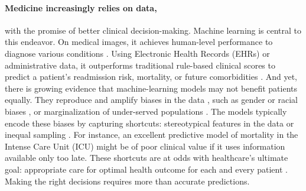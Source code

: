 \documentclass[french,12pt,twoside,a4paper]{book}
\begin{document}
\paragraph{Medicine increasingly relies on data,} with the promise of better
clinical decision-making. Machine learning is central to this endeavor.
On medical images, it achieves human-level performance to
diagnose various conditions
\citep{aggarwal2021diagnostic,esteva2021deep,liu2019comparison}.
Using Electronic Health Records (EHRs) or administrative data, it
outperforms traditional rule-based clinical scores to predict a patient's
readmission risk, mortality, or future comorbidities
\citep{rajkomar2018scalable,li2020behrt,beaulieu2021machine}.
%
And yet, there is growing evidence that machine-learning models may not benefit
patients equally. They reproduce and amplify biases in the data
\citep{rajkomar2018ensuring}, such as gender or racial biases
\citep{singh2022generalizability,gichoya2022ai,roosli2022peeking},
or marginalization of under-served populations
\citep{seyyed2021underdiagnosis}. The models
typically encode these biases by capturing shortcuts: stereotypical features in the data or inequal sampling \citep{geirhos2020shortcut,winkler2019association,degrave2021ai}.
%
For instance, an excellent predictive model of mortality in the Intense Care Unit
(ICU) might be of poor clinical value if it uses information available
only too late.
%
These shortcuts are at odds with healthcare's ultimate goal: appropriate care
for optimal health outcome for each and every patient
\citep{cma_policy_appropriateness_2015, ghassemi2020review}. Making the right decisions requires more than accurate predictions.
\end{document}
